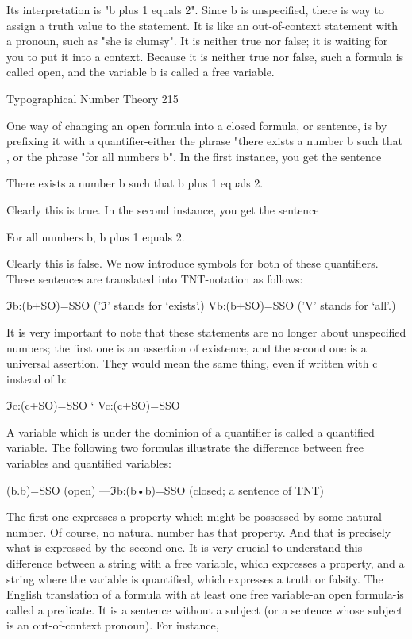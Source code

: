 Its interpretation is "b plus 1 equals 2". Since b is unspecified, there is way to assign a
truth value to the statement. It is like an out-of-context statement with a pronoun, such as
"she is clumsy". It is neither true nor false; it is waiting for you to put it into a context.
Because it is neither true nor false, such a formula is called open, and the variable b is
called a free variable.



Typographical Number Theory                                                               215

        One way of changing an open formula into a closed formula, or sentence, is by
prefixing it with a quantifier-either the phrase "there exists a number b such that , or the
phrase "for all numbers b". In the first instance, you get the sentence

       There exists a number b such that b plus 1 equals 2.

Clearly this is true. In the second instance, you get the sentence

       For all numbers b, b plus 1 equals 2.

Clearly this is false. We now introduce symbols for both of these quantifiers. These
sentences are translated into TNT-notation as follows:

                     ℑb:(b+SO)=SSO              ('ℑ' stands for `exists'.)
                     Vb:(b+SO)=SSO              ('V' stands for `all'.)

It is very important to note that these statements are no longer about unspecified
numbers; the first one is an assertion of existence, and the second one is a universal
assertion. They would mean the same thing, even if written with c instead of b:

                                     ℑc:(c+SO)=SSO `
                                     Vc:(c+SO)=SSO

A variable which is under the dominion of a quantifier is called a quantified variable. The
following two formulas illustrate the difference between free variables and quantified
variables:

                       (b.b)=SSO               (open)
                       ---ℑb:(b•b)=SSO         (closed; a sentence of TNT)

The first one expresses a property which might be possessed by some natural number. Of
course, no natural number has that property. And that is precisely what is expressed by
the second one. It is very crucial to understand this difference between a string with a free
variable, which expresses a property, and a string where the variable is quantified, which
expresses a truth or falsity. The English translation of a formula with at least one free
variable-an open formula-is called a predicate. It is a sentence without a subject (or a
sentence whose subject is an out-of-context pronoun). For instance,


